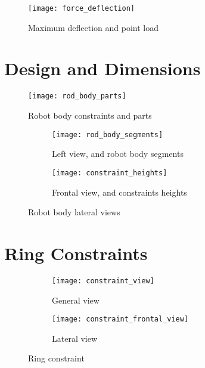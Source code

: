 \begin{figure}
    \centering
    \texttt{[image: force\_deflection]}
    \caption{Maximum deflection and point load}
    \label{fig:force_deflection}
\end{figure}

\section{Design and Dimensions}


\begin{figure}
    \centering
    \texttt{[image: rod\_body\_parts]}
    \caption{Robot body constraints and parts}
    \label{fig:bodyparts}
\end{figure}


\begin{figure}
    \centering
    \begin{subfigure}[t]{0.2625\textwidth}
        \texttt{[image: rod\_body\_segments]}
        \caption{Left view, and robot body segments}
        \label{fig:segments}
    \end{subfigure}
    \begin{subfigure}[t]{0.4375\textwidth}
        \texttt{[image: constraint\_heights]}
        \caption{Frontal view, and constraints heights}
        \label{fig:cons_heights}
    \end{subfigure}
    \caption{Robot body lateral views}
\end{figure}



\section{Ring Constraints}

\begin{figure}
    \centering
    \begin{subfigure}[t]{0.6\textwidth}
        \texttt{[image: constraint\_view]}
        \caption{General view}
        \label{fig:cons_view}
    \end{subfigure}
    \begin{subfigure}[t]{0.6\textwidth}
        \texttt{[image: constraint\_frontal\_view]}
        \caption{Lateral view}
        \label{fig:cons_front_view}
    \end{subfigure}
    \caption{Ring constraint}
    \label{ring_constraint}
\end{figure}


